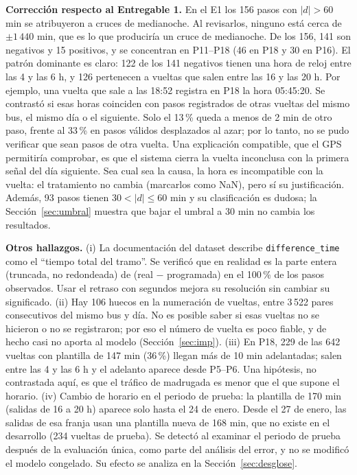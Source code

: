 \documentclass[conference,spanish]{IEEEtran}
\begin{document}
\textbf{Corrección respecto al Entregable 1.} En el E1 los 156 pasos con $|d|>60$ min se atribuyeron a cruces de medianoche. Al revisarlos, ninguno está cerca de $\pm1\,440$ min, que es lo que produciría un cruce de medianoche. De los 156, 141 son negativos y 15 positivos, y se concentran en P11--P18 (46 en P18 y 30 en P16). El patrón dominante es claro: 122 de los 141 negativos tienen una hora de reloj entre las 4 y las 6 h, y 126 pertenecen a vueltas que salen entre las 16 y las 20 h. Por ejemplo, una vuelta que sale a las 18:52 registra en P18 la hora 05:45:20. Se contrastó si esas horas coinciden con pasos registrados de otras vueltas del mismo bus, el mismo día o el siguiente. Solo el 13\,\% queda a menos de 2 min de otro paso, frente al 33\,\% en pasos válidos desplazados al azar; por lo tanto, no se pudo verificar que sean pasos de otra vuelta. Una explicación compatible, que el GPS permitiría comprobar, es que el sistema cierra la vuelta inconclusa con la primera señal del día siguiente. Sea cual sea la causa, la hora es incompatible con la vuelta: el tratamiento no cambia (marcarlos como NaN), pero sí su justificación. Además, 93 pasos tienen $30<|d|\le60$ min y su clasificación es dudosa; la Sección~\ref{sec:umbral} muestra que bajar el umbral a 30 min no cambia los resultados.

\textbf{Otros hallazgos.} (i) La documentación del dataset describe \texttt{difference\_time} como el ``tiempo total del tramo''. Se verificó que en realidad es la parte entera (truncada, no redondeada) de (real $-$ programada) en el 100\,\% de los pasos observados. Usar el retraso con segundos mejora su resolución sin cambiar su significado. (ii) Hay 106 huecos en la numeración de vueltas, entre 3\,522 pares consecutivos del mismo bus y día. No es posible saber si esas vueltas no se hicieron o no se registraron; por eso el número de vuelta es poco fiable, y de hecho casi no aporta al modelo (Sección~\ref{sec:imp}). (iii) En P18, 229 de las 642 vueltas con plantilla de 147 min (36\,\%) llegan más de 10 min adelantadas; salen entre las 4 y las 6 h y el adelanto aparece desde P5--P6. Una hipótesis, no contrastada aquí, es que el tráfico de madrugada es menor que el que supone el horario. (iv) Cambio de horario en el periodo de prueba: la plantilla de 170 min (salidas de 16 a 20 h) aparece solo hasta el 24 de enero. Desde el 27 de enero, las salidas de esa franja usan una plantilla nueva de 168 min, que no existe en el desarrollo (234 vueltas de prueba). Se detectó al examinar el periodo de prueba después de la evaluación única, como parte del análisis del error, y no se modificó el modelo congelado. Su efecto se analiza en la Sección~\ref{sec:desglose}.
\end{document}
